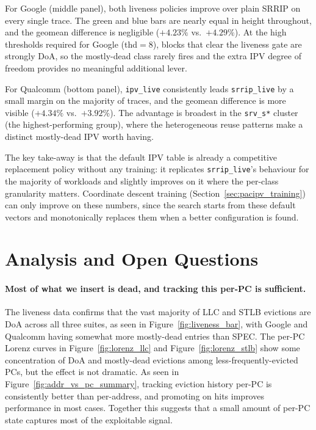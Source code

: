 \documentclass[12pt]{article}
\begin{document}
For Google (middle panel), both liveness policies improve
over plain SRRIP on every single trace.  The green and blue bars are nearly
equal in height throughout, and the geomean difference is negligible
($+4.23\%$ vs.\ $+4.29\%$).  At the high thresholds required for Google
(thd$=8$), blocks that clear the liveness gate are strongly DoA, so the
mostly-dead class rarely fires and the extra IPV degree of freedom provides no
meaningful additional lever.

For Qualcomm (bottom panel), \texttt{ipv\_live} consistently
leads \texttt{srrip\_live} by a small margin on the majority of traces, and the
geomean difference is more visible ($+4.34\%$ vs.\ $+3.92\%$).  The advantage
is broadest in the \texttt{srv\_s*} cluster (the highest-performing group),
where the heterogeneous reuse patterns make a distinct mostly-dead IPV worth
having.

The key take-away is that the default IPV table is already a competitive
replacement policy without any training: it replicates \texttt{srrip\_live}'s
behaviour for the majority of workloads and slightly improves on it where the
per-class granularity matters.  Coordinate descent training
(Section~\ref{sec:pacipv_training}) can only improve on these numbers, since the
search starts from these default vectors and monotonically replaces them when a
better configuration is found.

\clearpage
\section{Analysis and Open Questions}

\paragraph{Most of what we insert is dead, and tracking this per-PC is sufficient.}
The liveness data confirms that the vast majority of LLC and STLB evictions are DoA
across all three suites, as seen in Figure~\ref{fig:liveness_bar}, with Google and
Qualcomm having somewhat more mostly-dead entries than SPEC. The per-PC Lorenz
curves in Figure~\ref{fig:lorenz_llc} and Figure~\ref{fig:lorenz_stlb} show some
concentration of DoA and mostly-dead evictions among less-frequently-evicted PCs,
but the effect is not dramatic. As seen in Figure~\ref{fig:addr_vs_pc_summary},
tracking eviction history per-PC is consistently better than per-address, and
promoting on hits improves performance in most cases. Together this suggests that a
small amount of per-PC state captures most of the exploitable signal.
\end{document}
